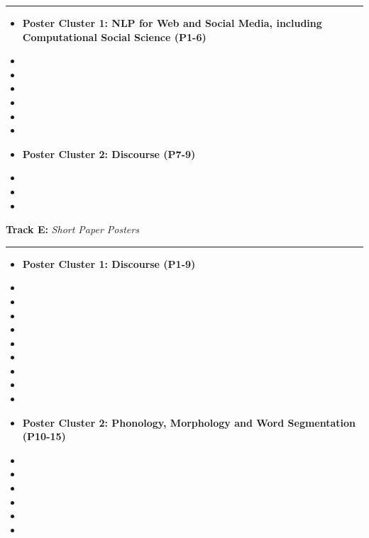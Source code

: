 \noindent \rule[0.5ex]{1\columnwidth}{1pt}
\begin{itemize}
\item []\textbf{Poster Cluster 1: NLP for Web and Social Media, including Computational Social Science (P1-6)}
\item {}
\item {}
\item {}
\item {}
\item {}
\item {}
\item []\textbf{Poster Cluster 2: Discourse (P7-9)}
\item {}
\item {}
\item {}
\end{itemize}

\bigskip{}
\noindent \textbf{Track E:} \emph{Short Paper Posters} \hfill \emph{}\smallskip{}

\noindent \rule[0.5ex]{1\columnwidth}{1pt}
\begin{itemize}
\item []\textbf{Poster Cluster 1: Discourse (P1-9)}
\item {}
\item {}
\item {}
\item {}
\item {}
\item {}
\item {}
\item {}
\item {}
\item []\textbf{Poster Cluster 2: Phonology, Morphology and Word Segmentation (P10-15)}
\item {}
\item {}
\item {}
\item {}
\item {}
\item {}
\end{itemize}

\clearpage
